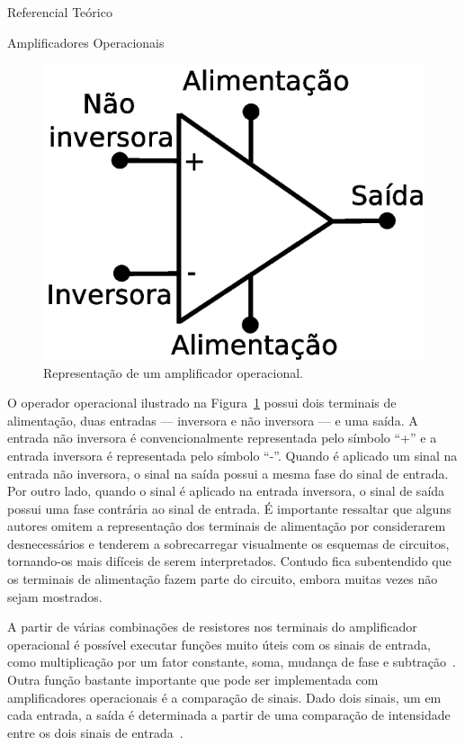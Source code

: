 \begin{chapter}{Referencial Teórico}
\begin{section}{Amplificadores Operacionais}
\begin{figure}[!h]
	\centering
	\begin{minipage}[c]{\textwidth}
	\centering
	\includegraphics[width=0.5\linewidth]{fig/opamp}
	\caption{Representação de um amplificador operacional.}
	\label{fig:opamp}
	\end{minipage}
\end{figure}

O operador operacional ilustrado na Figura~\ref{fig:opamp} possui dois terminais
de alimentação, duas entradas --- inversora e não inversora --- e uma saída. A
entrada não inversora é convencionalmente representada pelo símbolo ``+'' e a 
entrada inversora é representada pelo símbolo ``-''. Quando é aplicado um sinal
na entrada não inversora, o sinal na saída possui a mesma fase do sinal de
entrada. Por outro lado, quando o sinal é aplicado na entrada inversora, o sinal
de saída possui uma fase contrária ao sinal de entrada. É importante ressaltar
que alguns autores omitem a representação dos terminais de alimentação por
considerarem desnecessários e tenderem a sobrecarregar visualmente os esquemas
de circuitos, tornando-os mais difíceis de serem interpretados. Contudo fica
subentendido que os terminais de alimentação fazem parte do circuito, embora
muitas vezes não sejam mostrados.

A partir de várias combinações de resistores nos terminais do amplificador
operacional é possível executar funções muito úteis com os sinais de entrada, 
como multiplicação por um fator constante, soma, mudança de fase e
subtração~\cite{Nilson09}. Outra função bastante importante que pode ser
implementada com amplificadores operacionais é a comparação de sinais. Dado dois
sinais, um em cada entrada, a saída é determinada a partir de uma comparação de
intensidade entre os dois sinais de entrada~\cite{Terrell96}.  
 


\end{section}
\end{chapter}
